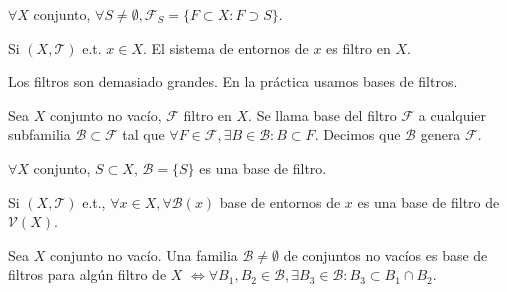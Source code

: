 \begin{ejm}
  $\forall X$ conjunto, $\forall S \neq \emptyset, \mathcal{F}_{S} = \{ F \subset X : F \supset S \}$.
\end{ejm}

\begin{ejm}
  Si $( X, \mathcal{T} )$ e.t. $x \in X$. El sistema de entornos de $x$ es filtro en $X$.
\end{ejm}

\begin{obs}
  Los filtros son demasiado grandes. En la práctica usamos bases de filtros.
\end{obs}

\begin{defn}
  Sea $X$ conjunto no vacío, $\mathcal{F}$ filtro en $X$. Se llama base del filtro $\mathcal{F}$ a cualquier subfamilia $\mathcal{B} \subset \mathcal{F}$ tal que $\forall F \in \mathcal{F}, \exists B \in \mathcal{B} : B \subset F$. Decimos que $\mathcal{B}$ genera $\mathcal{F}$.
\end{defn}

\begin{ejm}
  $\forall X $ conjunto, $S \subset X$, $\mathcal{B} = \{ S \}$ es una base de filtro.
\end{ejm}

\begin{ejm}
  Si $( X, \mathcal{T} )$ e.t., $\forall x \in X, \forall \mathcal{B}(x)$ base de entornos de $x$ es una base de filtro de $\mathcal{V}(X)$.
\end{ejm}

\begin{prop}
  Sea $X$ conjunto no vacío. Una familia $\mathcal{B} \neq \emptyset$ de conjuntos no vacíos es base de filtros para algún filtro de $X$ $\Leftrightarrow \forall B_{1}, B_{2} \in \mathcal{B}, \exists B_{3} \in \mathcal{B} : B_{3} \subset B_{1} \cap B_{2}$.
\end{prop}

